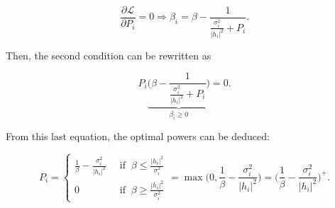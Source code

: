 \documentclass [a4paper, 11pt] {article}
\begin{document}
\begin{solution}
        \begin{equation} \frac{\partial \mathcal{L} }{\partial P_i} = 0 \Rightarrow \beta_i = \beta - \frac{1}{\frac{\sigma_i^2}{|h_i|^2} + P_i}. \end{equation}

        Then, the second condition can be rewritten as

        \begin{equation} P_i \underbrace{\Bigg( \beta - \frac{1}{\frac{\sigma_i^2}{|h_i|^2} + P_i} \Bigg)}_{\beta_i \geq 0 } = 0. \end{equation}


        From this last equation, the optimal powers can be deduced:

        \begin{equation*}
            P_i = \begin{cases}
              \frac{1}{\beta} - \frac{\sigma_i^2}{|h_i|^2}&\; \; \text{if} \; \; \beta \leq \frac{|h_i|^2}{\sigma_i^2}  \\
              0 &\; \; \text{if} \; \; \beta \geq \frac{|h_i|^2}{\sigma_i^2}
            \end{cases}  = \max \bigg(0, \frac{1}{\beta} - \frac{\sigma_i^2}{|h_i|^2} \bigg) = \bigg(\frac{1}{\beta} - \frac{\sigma_i^2}{|h_i|^2} \bigg)^+.
        \end{equation*}


    \end{solution}
\end{document}
